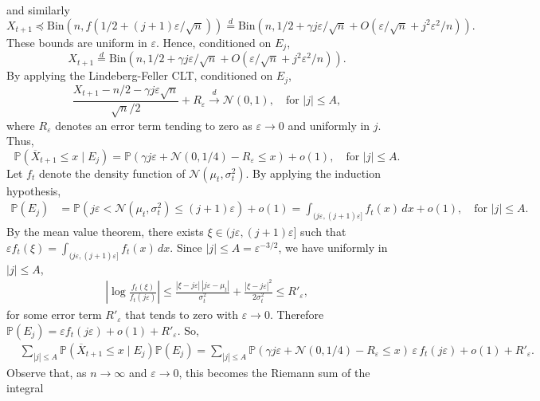 \documentclass[11pt]{article}
\newcommand{\Bin}{\mathrm{Bin}}
\newcommand{\Prob}{\mathbb{P}}
\numberwithin{theorem}{section}
\begin{document}
and similarly
\[
    X_{t+1} \preceq \Bin\left(n,f\left(1/2+(j+1)\varepsilon/\sqrt{n}\right)\right) \stackrel{d}{=}  \Bin\left(n, 1/2+\gamma j\varepsilon/\sqrt{n} + O\left(\varepsilon/\sqrt{n}+j^2\varepsilon^2/n\right) \right).
\]
These bounds are uniform in $\varepsilon$. Hence, conditioned on $E_j$,
\[  
    X_{t+1} \stackrel{d}{=} \Bin\left(n, 1/2 +\gamma    j\varepsilon/\sqrt{n} + O\left(\varepsilon/\sqrt{n}+j^2\varepsilon^2/n\right) \right).
\]
By applying the Lindeberg-Feller CLT, conditioned on $E_j$,
\[
    \frac{X_{t+1}-n/2-\gamma j\varepsilon \sqrt{n}}{\sqrt{n}/2} + R_\varepsilon \stackrel{d}{\to} \mathcal{N}(0,1),
    \quad\text{for } |j|\leq A,
\] 
where $R_\varepsilon$ denotes an error term tending to zero as $\varepsilon\to0$ and uniformly in $j$.
    Thus,
    \[
    \Prob\left(\overline{X}_{t+1}\leq x \mid E_j \right) = \Prob\left(\gamma j \varepsilon+\mathcal{N}\left(0,1/4\right)-R_\varepsilon \leq x \right) +o(1), \quad \text{for }|j|\leq A.
    \]
    Let $f_t$ denote the density function of $\mathcal{N}(\mu_t,\sigma_t^2)$. By applying the induction hypothesis,
    \begin{align*}
    \Prob\left(E_j \right) &= \Prob\left(j\varepsilon <\mathcal{N}\left(\mu_t, \sigma_t^2\right)\leq (j+1)\varepsilon\right) +o(1) = 
    \int_{(j\varepsilon,(j+1)\varepsilon]} f_t(x)\,dx + o(1),
    \quad \text{for }|j|\leq A.
    \end{align*}
    By the mean value theorem, there exists $\xi\in (j\varepsilon,(j+1)\varepsilon]$ such that $\varepsilon f_t(\xi)=\int_{(j\varepsilon,(j+1)\varepsilon]} f_t(x)\,dx$.
    Since $|j|\leq A=\varepsilon^{-3/2}$, we have uniformly in $|j|\leq A$,
    \begin{align*}
    \left|\log\frac{f_t(\xi)}{f_t(j\varepsilon)}\right|
    \leq \frac{|\xi-j\varepsilon|\,|j\varepsilon-\mu_t|}{\sigma_t^2}+\frac{|\xi-j\varepsilon|^2}{2\sigma_t^2}\leq R'_\varepsilon,
    \end{align*}
    for some error term $R'_\varepsilon$ that tends to zero with $\varepsilon \to 0$.
    Therefore $\Prob\left(E_j \right) = \varepsilon f_t(j\varepsilon)+o(1)+R'_\varepsilon$. So, 
    \begin{align*}
    &\sum_{|j|\leq A} \Prob\left(\overline{X}_{t+1}\leq x \mid E_j \right) \Prob\left(E_j \right) = \sum_{|j|\leq A} \Prob\left(\gamma j \varepsilon +\mathcal{N}(0,1/4)-R_\varepsilon \leq x \right)\,
    \varepsilon\, f_t(j \varepsilon) + o(1)+R'_\varepsilon.
    \end{align*}
    Observe that, as $n\to \infty$ and $\varepsilon\to0$, this becomes the Riemann sum of the integral
\end{document}

